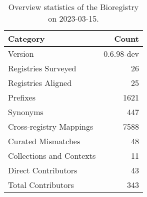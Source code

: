 \begin{table}
\centering
\caption{Overview statistics of the Bioregistry on 2023-03-15.}
\label{tab:bioregistry-summary}
\begin{tabular}{lr}
\toprule
                Category &      Count \\
\midrule
                 Version & 0.6.98-dev \\
     Registries Surveyed &         26 \\
      Registries Aligned &         25 \\
                Prefixes &       1621 \\
                Synonyms &        447 \\
 Cross-registry Mappings &       7588 \\
      Curated Mismatches &         48 \\
Collections and Contexts &         11 \\
     Direct Contributors &         43 \\
      Total Contributors &        343 \\
\bottomrule
\end{tabular}
\end{table}
